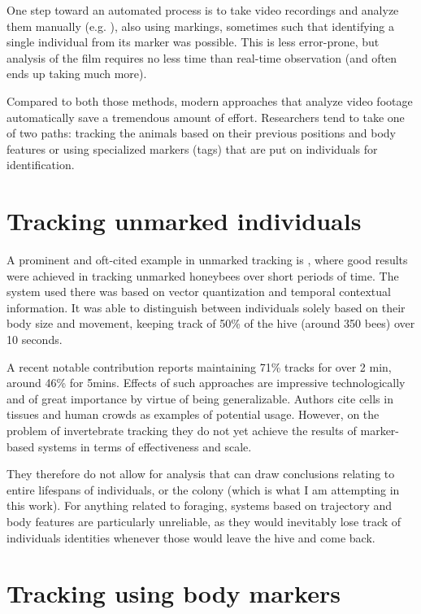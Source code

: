 One step toward an automated process is to take video recordings and analyze
them manually (e.g. \citep{naug_structure_2008}), also using markings, sometimes such
that identifying a single individual from its marker was possible. This is less
error-prone, but analysis of the film requires no less time than real-time
observation (and often ends up taking much more). 

Compared to both those methods, modern approaches that analyze video footage
automatically save a tremendous amount of effort. Researchers tend to take one
of two paths: tracking the animals based on their previous positions and body
features or using specialized markers (tags) that are put on individuals for
identification.

\section{Tracking unmarked individuals} 

A prominent and oft-cited example in unmarked tracking is
\citep{kimura_new_2011}, where good results were achieved in tracking unmarked
honeybees over short periods of time. The system used there was based on vector
quantization and temporal contextual information. It was able to distinguish
between individuals solely based on their body size and movement, keeping track
of 50\% of the hive (around 350 bees) over 10 seconds. 

A recent notable contribution \citep{bozek_pixel_2018} reports maintaining 71\% tracks
for over 2 min, around 46\% for 5mins. Effects of such approaches are impressive
technologically and of great importance by virtue of being generalizable. 
Authors cite cells in tissues and human crowds as examples of potential usage.
However, on the problem of invertebrate tracking they do not yet achieve the results
of marker-based systems in terms of effectiveness and scale. 

They therefore do not allow for analysis that can draw conclusions relating to
entire lifespans of individuals, or the colony (which is what I am attempting in
this work). For anything related to foraging, systems based on trajectory and
body features are particularly unreliable, as they would inevitably lose track
of individuals\’ identities whenever those would leave the hive and come back.

\section{Tracking using body markers}

